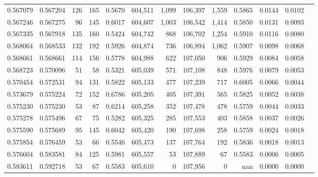 \begin{tabular}{rrrrrrrrrrrrr}
0.567079 & 0.567204 &   126 &   165 &                                     0.5670 & 604,511 &   1,099 & 106,397 &   1,559 & 0.5865 & 0.0144 & 0.0102 \\
0.567246 & 0.567275 &    96 &   145 &                                     0.6017 & 604,607 &   1,003 & 106,542 &   1,414 & 0.5850 & 0.0131 & 0.0093 \\
0.567335 & 0.567918 &   135 &   160 &                                     0.5424 & 604,742 &     868 & 106,702 &   1,254 & 0.5910 & 0.0116 & 0.0080 \\
0.568064 & 0.568533 &   132 &   192 &                                     0.5926 & 604,874 &     736 & 106,894 &   1,062 & 0.5907 & 0.0098 & 0.0068 \\
0.568661 & 0.568661 &   114 &   156 &                                     0.5778 & 604,988 &     622 & 107,050 &     906 & 0.5929 & 0.0084 & 0.0058 \\
0.568723 & 0.570096 &    51 &    58 &                                     0.5321 & 605,039 &     571 & 107,108 &     848 & 0.5976 & 0.0079 & 0.0053 \\
0.570454 & 0.572531 &    94 &   131 &                                     0.5822 & 605,133 &     477 & 107,239 &     717 & 0.6005 & 0.0066 & 0.0044 \\
0.573679 & 0.575224 &    72 &   152 &                                     0.6786 & 605,205 &     405 & 107,391 &     565 & 0.5825 & 0.0052 & 0.0038 \\
0.575230 & 0.575230 &    53 &    87 &                                     0.6214 & 605,258 &     352 & 107,478 &     478 & 0.5759 & 0.0044 & 0.0033 \\
0.575278 & 0.575496 &    67 &    75 &                                     0.5282 & 605,325 &     285 & 107,553 &     403 & 0.5858 & 0.0037 & 0.0026 \\
0.575590 & 0.575689 &    95 &   145 &                                     0.6042 & 605,420 &     190 & 107,698 &     258 & 0.5759 & 0.0024 & 0.0018 \\
0.575854 & 0.576459 &    53 &    66 &                                     0.5546 & 605,473 &     137 & 107,764 &     192 & 0.5836 & 0.0018 & 0.0013 \\
0.576604 & 0.583581 &    84 &   125 &                                     0.5981 & 605,557 &      53 & 107,889 &      67 & 0.5583 & 0.0006 & 0.0005 \\
0.583611 & 0.592718 &    53 &    67 &                                     0.5583 & 605,610 &       0 & 107,956 &       0 &    nan & 0.0000 & 0.0000 \\
\bottomrule
\end{tabular}
